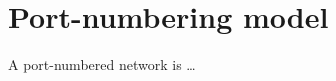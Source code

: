 \chapter{Port-numbering model}

\begin{definition}
    A port-numbered network is \ldots
\end{definition}